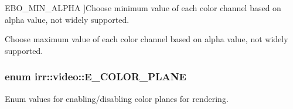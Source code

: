 \begin{Desc}
\begin{description}
{E\+B\+O\+\_\+\+M\+I\+N\+\_\+\+A\+L\+P\+HA\hypertarget{namespaceirr_1_1video_a6d78c1faed23a03e8ef7b7b623bbaf2fae3a17242783b97991a0fe87a3834a602}{}\label{namespaceirr_1_1video_a6d78c1faed23a03e8ef7b7b623bbaf2fae3a17242783b97991a0fe87a3834a602}
}]Choose minimum value of each color channel based on alpha value, not widely supported. \item[{\em 
E\+B\+O\+\_\+\+M\+A\+X\+\_\+\+A\+L\+P\+HA\hypertarget{namespaceirr_1_1video_a6d78c1faed23a03e8ef7b7b623bbaf2faaff74cfa9463e02759bcd5606e2e0e63}{}\label{namespaceirr_1_1video_a6d78c1faed23a03e8ef7b7b623bbaf2faaff74cfa9463e02759bcd5606e2e0e63}
}]Choose maximum value of each color channel based on alpha value, not widely supported. \end{description}
\end{Desc}
\subsubsection[{\texorpdfstring{E\+\_\+\+C\+O\+L\+O\+R\+\_\+\+P\+L\+A\+NE}{E\_COLOR\_PLANE}}]{\setlength{\rightskip}{0pt plus 5cm}enum {\bf irr\+::video\+::\+E\+\_\+\+C\+O\+L\+O\+R\+\_\+\+P\+L\+A\+NE}}\hypertarget{namespaceirr_1_1video_aa9f25191ae536c1a4b08ec5334866a21}{}\label{namespaceirr_1_1video_aa9f25191ae536c1a4b08ec5334866a21}


Enum values for enabling/disabling color planes for rendering. 

